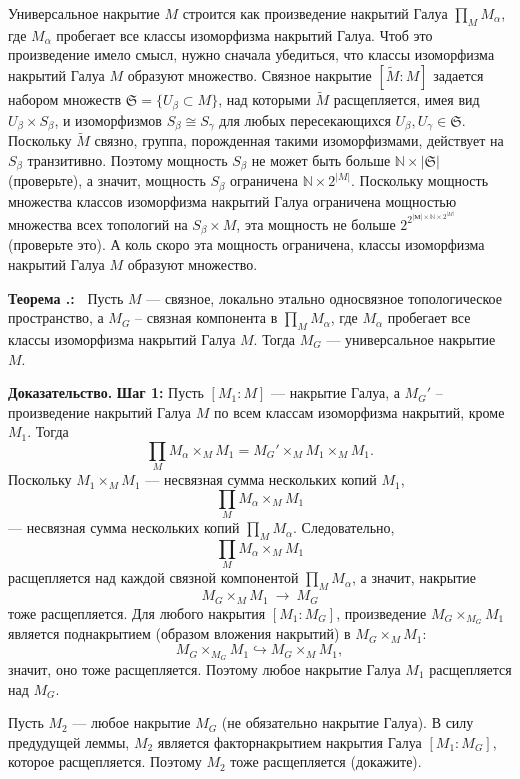 \documentclass[12pt]{book}
\newcommand{\arrow}{{\:\longrightarrow\:}}
\def\endproof{\hbox{\vrule width 5pt height 5pt depth 0pt}}
\def\N{{\mathbb N}}
\theoremstyle{upshape}
\theoremstyle{generic}
\theoremstyle{upshapenonumber}
\newcommand{\следствие}{%
     \refstepcounter{teorema}
     {\noindent\bf Следствие \thechapter.\arabic{teorema}:\ }}
\newcommand{\пример}{%
     \refstepcounter{teorema}
     {\noindent\bf Пример \thechapter.\arabic{teorema}:\ }}
\newcommand{\лемма}{%
     \refstepcounter{teorema}
     {\noindent\bf Лемма \thechapter.\arabic{teorema}:\ }}
\newcommand{\теорема}{%
     \refstepcounter{teorema}
     {\noindent\bf Теорема \thechapter.\arabic{teorema}:\ }}
\newcommand{\утверждение}{%
     \refstepcounter{teorema}
     {\noindent\bf Утверждение \thechapter.\arabic{teorema}:\ }}
\def\хфилл{\hfill}
\def\ноиндент{\noindent}
\def\бф{\bf}
\def\goth{\mathfrak}
\begin{document}
Универсальное накрытие $M$ строится как произведение
накрытий Галуа $\prod_M M_\alpha$, где $M_\alpha$ пробегает
все классы изоморфизма накрытий Галуа. 
Чтоб это произведение имело смысл, нужно сначала
убедиться, что классы изоморфизма накрытий Галуа
$M$ образуют множество. Связное накрытие $[\tilde M: M]$
задается набором множеств ${\goth S}=\{ U_\beta \subset M\}$,
над которыми $\tilde M$ расщепляется, имея 
вид $U_\beta \times S_\beta$, и изоморфизмов 
$S_\beta\cong S_\gamma$ для любых пересекающихся
$U_\beta, U_\gamma\in {\goth S}$. 
Поскольку $\tilde M$ связно, группа, порожденная
такими изоморфизмами, действует на $S_\beta$
транзитивно. Поэтому мощность 
$S_\beta$ не может быть больше $\N \times |\goth S|$ (проверьте),
а значит, мощность $S_\beta$ ограничена $\N \times 2^{|M|}$.
Поскольку мощность множества классов изоморфизма
накрытий Галуа ограничена мощностью множества
всех топологий на $S_\beta\times M$,  эта мощность
не больше $2^{2^{|М|\times \N \times 2^{|M|}}}$
(проверьте это). А коль скоро эта мощность
ограничена, классы изоморфизма накрытий Галуа
$M$ образуют множество.

\хфилл

\теорема
Пусть $M$ --- связное, локально этально односвязное
топологическое пространство, а $M_G$ --
связная компонента в $\prod_M M_\alpha$, где $M_\alpha$ пробегает
все классы изоморфизма накрытий Галуа $M$.
Тогда $M_G$ --- универсальное накрытие $M$.


\хфилл

\ноиндент
{\бф Доказательство.} {\bf Шаг 1:}
Пусть $[M_1:M]$ --- накрытие Галуа, а $M_G'$ --
произведение накрытий Галуа $M$ по всем классам
изоморфизма накрытий, кроме $M_1$.
Тогда 
\[ \prod_M M_\alpha\times_M M_1 = M_G'\times_M
M_1\times_M M_1.
\]
Поскольку $M_1\times_M M_1$ --- несвязная сумма нескольких
копий $M_1$, \[ \prod_M M_\alpha\times_M M_1\] --- несвязная
сумма нескольких копий $\prod_M M_\alpha$.
Следовательно, \[ \prod_M M_\alpha\times_M M_1\]
расщепляется над каждой связной компонентой
$\prod_M M_\alpha$, а значит, накрытие
\[ M_G \times_M M_1\arrow M_G \] тоже расщепляется.
Для любого накрытия
$[M_1:M_G]$, произведение 
$M_G \times_{M_G}M_1$ является 
поднакрытием (образом вложения накрытий) в $M_G \times_M M_1$:
\[ M_G \times_{M_G}M_1\hookrightarrow
   M_G \times_M M_1,
\] 
значит, оно тоже расщепляется. Поэтому любое накрытие
Галуа $M_1$ расщепляется над $M_G$.

\хфилл

\ноиндент {\bf Шаг 2:}
Пусть $M_2$ --- любое накрытие $M_G$
(не обязательно накрытие Галуа). В силу
предудущей леммы, $M_2$ является
факторнакрытием накрытия Галуа
 $[M_1:M_G]$, которое расщепляется.
Поэтому $M_2$ тоже расщепляется (докажите).
\endproof
\end{document}
